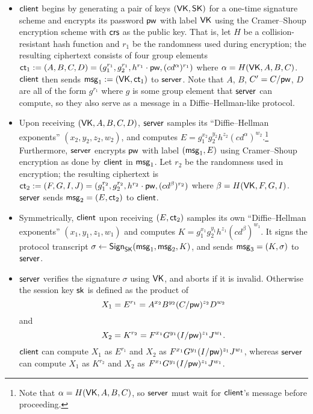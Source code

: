 \begin{itemize}
	\item $\mathsf{client}$ begins by generating a pair of keys $(\mathsf{VK},\mathsf{SK})$ for a one-time signature scheme and encrypts its password $\mathsf{pw}$ with label $\mathsf{VK}$ using the Cramer--Shoup encryption scheme with $\mathsf{crs}$ as the public key. That is, let $H$ be a collision-resistant hash function and $r_1$ be the randomness used during encryption; the resulting ciphertext consists of four group elements $\mathsf{ct}_1 := (A,B,C,D) = (g_1^{r_1}, g_2^{r_1}, h^{r_1} \cdot\mathsf{pw}, (cd^\alpha)^{r_1})$ where $\alpha = H(\mathsf{VK}, A, B, C)$. $\mathsf{client}$ then sends $\mathsf{msg}_{1} := (\mathsf{VK}, \mathsf{ct}_1)$ to $\mathsf{server}$. Note that $A$, $B$, $C' = C/\mathsf{pw}$, $D$ are all of the form $g^{r_1}$ where $g$ is some group element that $\mathsf{server}$ can compute, so they also serve as a message in a Diffie--Hellman-like protocol.
	
	\item Upon receiving $(\mathsf{VK},A,B,C,D)$, $\mathsf{server}$ samples its ``Diffie--Hellman exponents'' $(x_2, y_2, z_2, w_2)$, and computes $E = g_1^{x_2}g_2^{y_2}h^{z_2}(cd^\alpha)^{w_2}$.\footnote{Note that $\alpha = H(\mathsf{VK},A,B,C)$, so $\mathsf{server}$ must wait for $\mathsf{client}$'s message before proceeding.} Furthermore, $\mathsf{server}$ encrypts $\mathsf{pw}$ with label $(\mathsf{msg}_{1}, E)$ using Cramer--Shoup encryption as done by $\mathsf{client}$ in $\mathsf{msg}_{1}$. Let $r_2$ be the randomness used in encryption; the resulting ciphertext is $\mathsf{ct}_2:=(F,G,I,J) = (g_1^{r_2}, g_2^{r_2}, h^{r_2} \cdot\mathsf{pw}, (cd^\beta)^{r_2})$ where $\beta = H(\mathsf{VK}, F, G, I)$. $\mathsf{server}$ sends $\mathsf{msg}_{2} = (E,\mathsf{ct}_2)$ to $\mathsf{client}$.
	
	\item Symmetrically, $\mathsf{client}$ upon receiving $(E,\mathsf{ct}_2)$ samples its own ``Diffie--Hellman exponents'' $(x_1,y_1,z_1,w_1)$ and computes $K = g_1^{x_1}g_2^{y_1}h^{z_1}(cd^\beta)^{w_1}$. It signs the protocol transcript $\sigma \gets \mathsf{Sign}_{\mathsf{SK}}(\mathsf{msg}_{1},\mathsf{msg}_{2},K)$, and sends $\mathsf{msg}_{3} = (K, \sigma)$ to $\mathsf{server}$.
	
	\item $\mathsf{server}$ verifies the signature $\sigma$ using $\mathsf{VK}$, and aborts if it is invalid. Otherwise the session key $\mathsf{sk}$ is defined as the product of
	\[
	X_1 = E^{r_1} = A^{x_2}B^{y_2}(C/\mathsf{pw})^{z_2}D^{w_2}
	\]
	and
	\[
	X_2 = K^{r_2} = F^{x_1}G^{y_1}(I/\mathsf{pw})^{z_1}J^{w_1}.
	\]
	$\mathsf{client}$ can compute $X_1$ as $E^{r_1}$ and $X_2$ as $F^{x_1}G^{y_1}(I/\mathsf{pw})^{z_1}J^{w_1}$, whereas $\mathsf{server}$ can compute $X_1$ as $K^{r_2}$ and $X_2$ as $F^{x_1}G^{y_1}(I/\mathsf{pw})^{z_1}J^{w_1}$.
\end{itemize}

